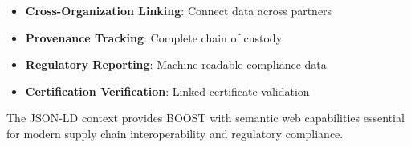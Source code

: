 \begin{itemize}
    \item \textbf{Cross-Organization Linking}: Connect data across partners
    \item \textbf{Provenance Tracking}: Complete chain of custody
    \item \textbf{Regulatory Reporting}: Machine-readable compliance data
    \item \textbf{Certification Verification}: Linked certificate validation
\end{itemize}

The JSON-LD context provides BOOST with semantic web capabilities essential for modern supply chain interoperability and regulatory compliance.